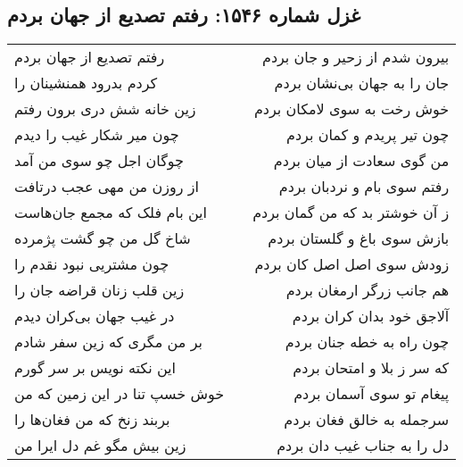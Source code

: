 \begin{center}
\section*{غزل شماره ۱۵۴۶: رفتم تصدیع از جهان بردم}
\label{sec:1546}
\begin{longtable}{l p{0.5cm} r}
رفتم تصدیع از جهان بردم
&&
بیرون شدم از زحیر و جان بردم
\\
کردم بدرود همنشینان را
&&
جان را به جهان بی‌نشان بردم
\\
زین خانه شش دری برون رفتم
&&
خوش رخت به سوی لامکان بردم
\\
چون میر شکار غیب را دیدم
&&
چون تیر پریدم و کمان بردم
\\
چوگان اجل چو سوی من آمد
&&
من گوی سعادت از میان بردم
\\
از روزن من مهی عجب درتافت
&&
رفتم سوی بام و نردبان بردم
\\
این بام فلک که مجمع جان‌هاست
&&
ز آن خوشتر بد که من گمان بردم
\\
شاخ گل من چو گشت پژمرده
&&
بازش سوی باغ و گلستان بردم
\\
چون مشتریی نبود نقدم را
&&
زودش سوی اصل اصل کان بردم
\\
زین قلب زنان قراضه جان را
&&
هم جانب زرگر ارمغان بردم
\\
در غیب جهان بی‌کران دیدم
&&
آلاجق خود بدان کران بردم
\\
بر من مگری که زین سفر شادم
&&
چون راه به خطه جنان بردم
\\
این نکته نویس بر سر گورم
&&
که سر ز بلا و امتحان بردم
\\
خوش خسپ تنا در این زمین که من
&&
پیغام تو سوی آسمان بردم
\\
بربند زنخ که من فغان‌ها را
&&
سرجمله به خالق فغان بردم
\\
زین بیش مگو غم دل ایرا من
&&
دل را به جناب غیب دان بردم
\\
\end{longtable}
\end{center}
